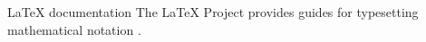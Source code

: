 \begin{frame}{LaTeX documentation}
  The LaTeX Project provides guides for typesetting mathematical notation
  \cite{latex-core-documentation}.
  \medskip

  \printbibliography[heading=none]
\end{frame}
